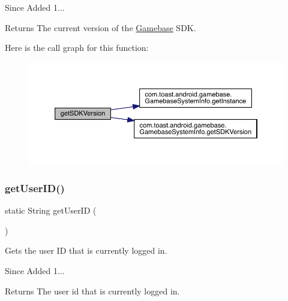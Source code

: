\begin{DoxySince}{Since}
Added 1... 
\end{DoxySince}
\begin{DoxyReturn}{Returns}
The current version of the \hyperlink{classcom_1_1toast_1_1android_1_1gamebase_1_1_gamebase}{Gamebase} S\+DK. 
\end{DoxyReturn}
Here is the call graph for this function\+:
\nopagebreak
\begin{figure}[H]
\begin{center}
\leavevmode
\includegraphics[width=350pt]{classcom_1_1toast_1_1android_1_1gamebase_1_1_gamebase_aeb5168abbd62c631b65247e6289d1e2d_cgraph}
\end{center}
\end{figure}
\mbox{\label{classcom_1_1toast_1_1android_1_1gamebase_1_1_gamebase_ab7c1e87ef968e274d77774ea7c814f07}} 
\subsubsection{\texorpdfstring{get\+User\+I\+D()}{getUserID()}}
{\footnotesize\ttfamily static String get\+User\+ID (\begin{DoxyParamCaption}{ }\end{DoxyParamCaption})\hspace{0.3cm}{\ttfamily [static]}}



Gets the user ID that is currently logged in. 

\begin{DoxySince}{Since}
Added 1... 
\end{DoxySince}
\begin{DoxyReturn}{Returns}
The user id that is currently logged in. 
\end{DoxyReturn}
\mbox{\label{classcom_1_1toast_1_1android_1_1gamebase_1_1_gamebase_a1b2d26183c219ab1ef840a95af71bd88}} 

